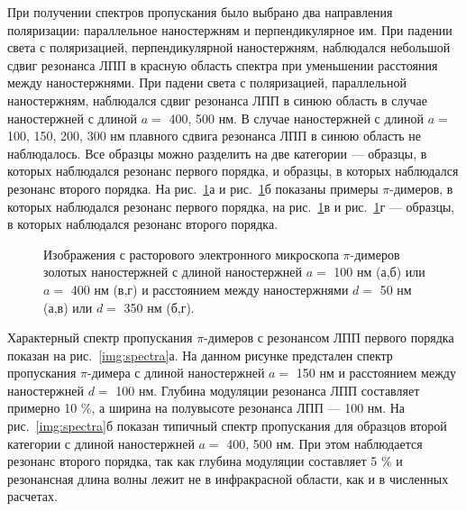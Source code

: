 При получении спектров пропускания было выбрано два направления поляризации: параллельное наностержням и перпендикулярное им. При падении света с поляризацией, перпендикулярной наностержням, наблюдался небольшой сдвиг резонанса ЛПП в красную область спектра при уменьшении расстояния между наностержнями. При падени света с поляризацией, параллельной наностержням, наблюдался сдвиг резонанса ЛПП в синюю область в случае наностержней с длиной $ a = $ 400, 500 нм. В случае наностержней с длиной $ a = $ 100, 150, 200, 300 нм плавного сдвига резонанса ЛПП в синюю область не наблюдалось.
Все образцы можно разделить на две категории --- образцы, в которых наблюдался резонанс первого порядка, и образцы, в которых наблюдался резонанс второго порядка. На рис.~\ref{img:samples}а и рис.~\ref{img:samples}б показаны примеры $ \pi $-димеров, в которых наблюдался резонанс первого порядка, на рис.~\ref{img:samples}в и рис.~\ref{img:samples}г --- образцы, в которых наблюдался резонанс второго порядка.
\begin{figure}[!h]
\caption{Изображения с расторового электронного микроскопа $ \pi $-димеров золотых наностержней с длиной наностержней $ a = $ 100 нм (а,б) или $ a = $ 400 нм (в,г) и расстоянием между наностержнями $ d = $ 50 нм (а,в) или $ d = $ 350 нм (б,г).}
\label{img:samples}
\end{figure}
Характерный спектр пропускания $ \pi $-димеров с резонансом ЛПП первого порядка показан на рис.~\ref{img:spectra}а. На данном рисунке предстален спектр пропускания $ \pi$-димера с длиной наностержней $ a = $ 150 нм и расстоянием между наностержней $ d = $ 100 нм. Глубина модуляции резонанса ЛПП составляет примерно 10 \%, а ширина на полувысоте резонанса ЛПП --- 100 нм. На рис.~\ref{img:spectra}б показан типичный спектр пропускания для образцов второй категории с длиной наностержней $ a = $ 400, 500 нм. При этом наблюдается резонанс второго порядка, так как глубина модуляции составляет 5 \% и резонансная длина волны лежит не в инфракрасной области, как и в численных расчетах.

